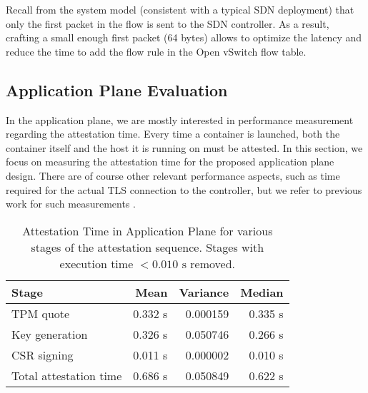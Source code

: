 {Recall from the system model (consistent with a typical SDN deployment) that only the first packet in the flow is sent to the SDN controller.
As a result, crafting a small enough first packet (64 bytes) allows to optimize the latency and reduce the time to add the flow rule in the Open vSwitch flow table.

\subsection{Application Plane Evaluation}
\label{subsec:application-evaluation}

In the application plane, we are mostly interested in performance measurement regarding the attestation time.
Every time a container is launched, both the container itself and the host it is running on must be attested.
In this section, we focus on measuring the attestation time for the proposed application plane design.
There are of course other relevant performance aspects, such as time required for the actual TLS connection to the controller, but we refer to previous work for such measurements \cite{girtler:2017}.

\begin{table}[h] %
	\centering
	\caption{Attestation Time in Application Plane for various stages of the attestation sequence. Stages with execution time $< 0.010 \text{ s}$ removed.}
	\label{tbl:apptotalatttime}
	\setlength{\tabcolsep}{3pt}
	\begin{tabular}{lrrr}
		\toprule
		Stage & Mean & Variance & Median \\
		\midrule
		TPM quote              & 0.332 s & 0.000159 & 0.335 s \\
		Key generation         & 0.326 s & 0.050746 & 0.266 s \\
		CSR signing            & 0.011 s & 0.000002 & 0.010 s \\
		\midrule
		Total attestation time & 0.686 s & 0.050849 & 0.622 s \\
		\bottomrule
	\end{tabular}
\end{table}

}
